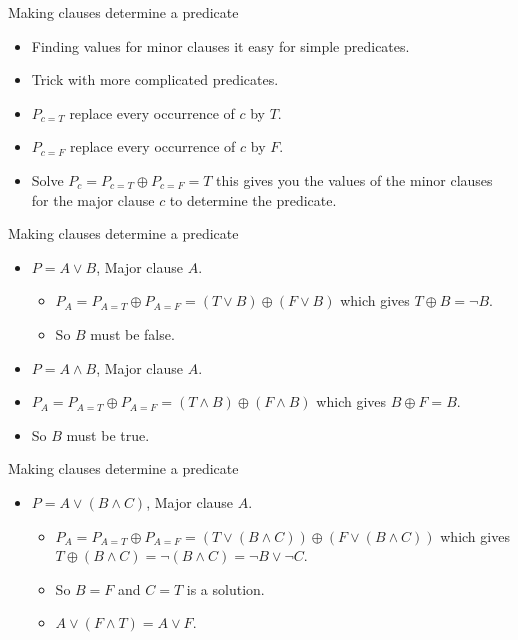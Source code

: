 \documentclass{beamer}
\begin{document}
\begin{frame}{Making clauses determine a predicate}
  \begin{itemize}
  \item Finding values for minor clauses it easy for simple
    predicates.
  \item Trick with more complicated predicates.
  \item $P_{c=T}$ replace every occurrence of $c$ by $T$.
  \item $P_{c=F}$ replace every occurrence of $c$ by $F$.
  \item Solve $P_c = P_{c=T} \oplus P_{c=F} = T$ this gives you the
    values of the minor clauses for the major clause $c$ to determine
    the predicate.
  \end{itemize}
  
\end{frame}
\begin{frame}{Making clauses determine a predicate}
  \begin{itemize}
  \item $P=A\lor B$, Major clause $A$.
    \begin{itemize}
    \item $P_A = P_{A=T} \oplus P_{A=F} = (T \lor B) \oplus (F
      \lor B)$ which gives $T \oplus B = \neg B$. 
    \item So $B$ must be false.
    \end{itemize}
    \item $P=A\land B$, Major clause $A$.
    \item $P_A = P_{A=T} \oplus P_{A=F} = (T \land B) \oplus (F
      \land B)$ which gives $B \oplus F =  B$. 
    \item So $B$ must be true.
  \end{itemize}
\end{frame}
\begin{frame}{Making clauses determine a predicate}
  \begin{itemize}
  \item $P=A\lor (B\land C)$, Major clause $A$.
    \begin{itemize}
    \item $P_A = P_{A=T} \oplus P_{A=F} = (T \lor (B\land C)) \oplus
      (F 
      \lor (B\land C))$ which gives $T\oplus (B\land C) = \neg (B
      \land C) = \neg B \lor \neg C$.
    \item So $B=F$ and $C=T$ is a solution.
    \item $A \lor (F \land T) = A \lor F$. 
    \end{itemize}

  \end{itemize}
\end{frame}
\end{document}
